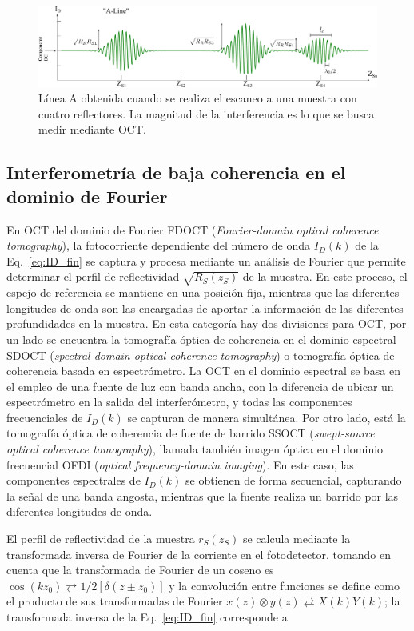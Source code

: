 \begin{figure}[h!]
	\centering
	\includegraphics[width=\linewidth,keepaspectratio]{img/A_Line_1Gen}
	\caption{Línea A obtenida cuando se realiza el escaneo a una muestra con cuatro reflectores. La magnitud de la interferencia es lo que se busca medir mediante OCT.}
	\label{fig:tdoct}
\end{figure}


\subsection{Interferometría de baja coherencia en el dominio de Fourier}

En OCT del dominio de Fourier FDOCT (\textit{Fourier-domain optical coherence tomography}), la fotocorriente dependiente del número de onda $I_D(k)$ de la Eq.~\ref{eq:ID_fin} se captura y procesa mediante un análisis de Fourier que permite determinar el perfil de reflectividad $\sqrt{R_S(z_S)}$ de la muestra. En este proceso, el espejo de referencia se mantiene en una posición fija, mientras que las diferentes longitudes de onda son las encargadas de aportar la información de las diferentes profundidades en la muestra. En esta categoría hay dos divisiones para OCT, por un lado se encuentra  la tomografía óptica de coherencia en el dominio espectral SDOCT (\textit{spectral-domain optical coherence tomography}) o tomografía óptica de coherencia basada en espectrómetro. La OCT en el dominio espectral se basa en el empleo de una fuente de luz con banda ancha, con la diferencia de ubicar un espectrómetro en la salida del interferómetro, y todas las componentes frecuenciales de $I_D(k)$ se capturan de manera simultánea. Por otro lado, está la tomografía óptica de coherencia de fuente de barrido SSOCT (\textit{swept-source optical coherence tomography}), llamada también imagen óptica en el dominio frecuencial OFDI (\textit{optical frequency-domain imaging}). En este caso, las componentes espectrales de $I_D(k)$ se obtienen de forma secuencial, capturando la señal de una banda angosta, mientras que la fuente realiza un barrido por las diferentes longitudes de onda.

El perfil de reflectividad de la muestra $r_S(z_S)$ se calcula mediante la transformada inversa de Fourier de la corriente en el fotodetector, tomando en cuenta que la transformada de Fourier de un coseno es $\cos(kz_0) \rightleftarrows 1/2[\delta(z\pm z_0)]$ y la convolución entre funciones se define como el producto de sus transformadas de Fourier $x(z) \otimes y(z) \rightleftarrows X(k)Y(k)$; la transformada inversa de la Eq.~\ref{eq:ID_fin} corresponde a

